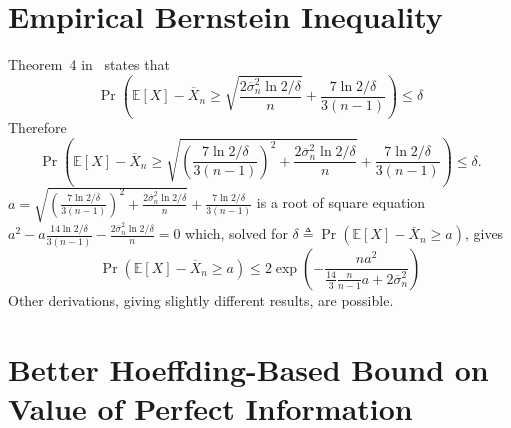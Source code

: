 \documentclass{article}
\newcommand {\IE} {\ensuremath {\mathbb{E}}}
\begin{document}
\section{Empirical Bernstein Inequality}
\label{app:deriv-conc-empbernstein}

Theorem~4 in~\cite{MaurerPontil.benrstein} states that
\begin{equation}
\Pr\left(\IE[X]-\overline X_n
    \ge \sqrt { \frac {2\overline\sigma_n^2 \ln 2/\delta} n } + \frac {7 \ln 2/\delta} {3(n-1)}\right)\le \delta
\end{equation}
Therefore
\begin{equation}
\Pr\left(\IE[X]-\overline X_n \ge
              \sqrt { \left(\frac {7 \ln 2/\delta} {3(n-1)}\right)^2+\frac {2\overline\sigma_n^2 \ln 2/\delta} n }
                      + \frac {7 \ln 2/\delta} {3(n-1)}\right)
   \le \delta.
\end{equation}
$a=\sqrt { \left(\frac {7 \ln 2/\delta} {3(n-1)}\right)^2+\frac {2\overline\sigma_n^2 \ln 2/\delta} n } + \frac {7 \ln 2/\delta} {3(n-1)}$
 is a root of square equation $a^2-a\frac {14 \ln 2/\delta} {3(n-1)} -\frac {2\overline\sigma_n^2 \ln 2/\delta} n=0$
which, solved for $\delta\triangleq\Pr(\IE[X]-\overline X_n\ge a)$,
gives
\begin{equation*}
\Pr(\IE[X]-\overline X_n\ge a)\le 2\exp \left( - \frac {na^2} {\frac {14} {3} \frac {n} {n-1}a+2\overline\sigma_n^2}\right)
\end{equation*}
Other derivations, giving slightly different results, are possible.

\section{Better Hoeffding-Based Bound on Value of Perfect Information}
\label{app:better-hoeffding-bound}
\end{document}
